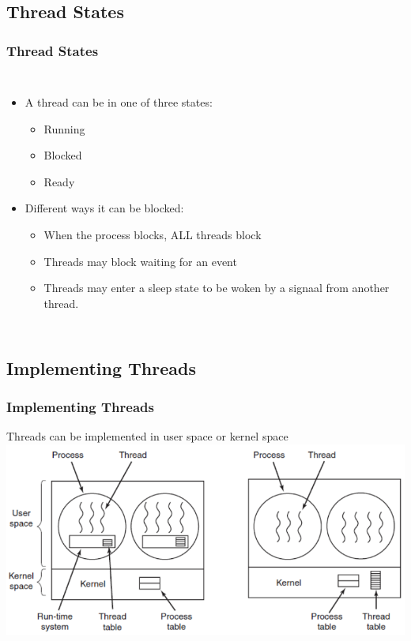 \documentclass{beamer}
\begin{document}
\subsection{Thread States}
\begin{frame}
\frametitle{Thread States}
\begin{columns}[c]
\begin{itemize}
\item A thread can be in one of three states:
\begin{itemize}
\item Running
\item Blocked
\item Ready
\end{itemize}
\item Different ways it can be blocked:
\begin{itemize}
\item When the process blocks, ALL threads block
\item Threads may block waiting for an event
\item Threads may enter a sleep state to be woken by a signaal from another thread.
\end{itemize}
\end{itemize}
\end{columns}
\end{frame}
\subsection{Implementing Threads}
\begin{frame}
\frametitle{Implementing Threads}
Threads can be implemented in user space or kernel space
\includegraphics[scale=0.4]{thr.png}
\end{frame}
\end{document}
